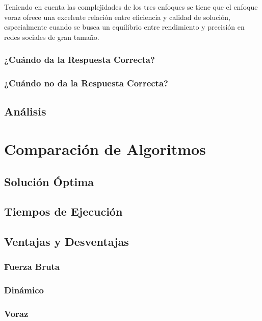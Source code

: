 \documentclass[11pt,letter]{article}
\begin{document}
Teniendo en cuenta las complejidades de los tres enfoques se tiene que el enfoque voraz ofrece una excelente relación entre eficiencia y calidad de solución, especialmente cuando se busca un equilibrio entre rendimiento y precisión en redes sociales de gran tamaño.

\subsubsection{¿Cuándo da la Respuesta Correcta?}
\subsubsection{¿Cuándo no da la Respuesta Correcta?}
\subsection{Análisis}


\newpage

\section{Comparación de Algoritmos}
\subsection{Solución Óptima}
\subsection{Tiempos de Ejecución}
\subsection{Ventajas y Desventajas}
\subsubsection{Fuerza Bruta}
\subsubsection{Dinámico}
\subsubsection{Voraz}

\newpage

\end{document}
